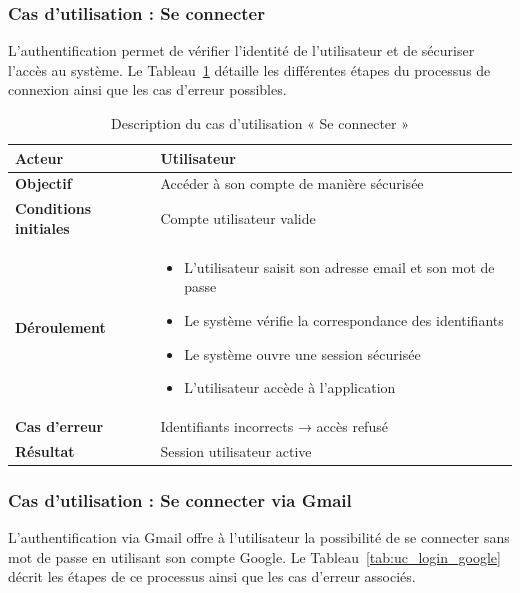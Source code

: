 \subsubsection{Cas d’utilisation : Se connecter}

L’authentification permet de vérifier l’identité de l’utilisateur et de sécuriser l’accès au système. Le Tableau~\ref{tab:uc_login} détaille les différentes étapes du processus de connexion ainsi que les cas d’erreur possibles.

\begin{table}[H]
\centering
\renewcommand{\arraystretch}{1.2}
\begin{tabular}{|p{4cm}|p{10cm}|}
\hline
\textbf{Acteur} & Utilisateur \\ \hline

\textbf{Objectif} & Accéder à son compte de manière sécurisée \\ \hline

\textbf{Conditions initiales} & Compte utilisateur valide \\ \hline

\textbf{Déroulement} &
\begin{itemize}
    \item L’utilisateur saisit son adresse email et son mot de passe
    \item Le système vérifie la correspondance des identifiants
    \item Le système ouvre une session sécurisée
    \item L’utilisateur accède à l’application
\end{itemize} \\ \hline

\textbf{Cas d’erreur} & Identifiants incorrects → accès refusé \\ \hline

\textbf{Résultat} & Session utilisateur active \\ \hline
\end{tabular}
\caption{Description du cas d’utilisation « Se connecter »}
\label{tab:uc_login}
\end{table}

\subsubsection{Cas d’utilisation : Se connecter via Gmail}

L’authentification via Gmail offre à l’utilisateur la possibilité de se connecter sans mot de passe en utilisant son compte Google. Le Tableau~\ref{tab:uc_login_google} décrit les étapes de ce processus ainsi que les cas d’erreur associés.


